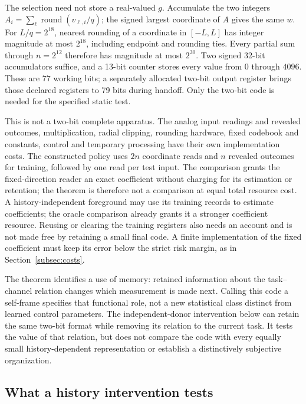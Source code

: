 \documentclass[12pt]{article}
\theoremstyle{definition}
\begin{document}
The selection need not store a real-valued $g$.
Accumulate the two integers
$A_i=\sum_\ell\operatorname{round}(v_{\ell,i}/q)$;
the signed largest coordinate of $A$ gives the same $w$.
For $L/q=2^{18}$, nearest rounding of a coordinate in $[-L,L]$
has integer magnitude at most $2^{18}$, including endpoint and
rounding ties. Every partial sum through $n=2^{12}$ therefore has
magnitude at most $2^{30}$. Two signed 32-bit accumulators suffice,
and a 13-bit counter stores every value from $0$ through $4096$.
These are 77 working bits; a separately allocated two-bit output
register brings those declared registers to 79 bits during handoff.
Only the two-bit code is needed for the specified static test.

This is not a two-bit complete apparatus.
The analog input readings and revealed outcomes, multiplication,
radial clipping, rounding hardware, fixed codebook and constants,
control and temporary processing have their own implementation costs.
The constructed policy uses $2n$ coordinate reads and $n$ revealed
outcomes for training, followed by one read per test input. The
comparison grants the fixed-direction reader an exact coefficient
without charging for its estimation or retention; the theorem is
therefore not a comparison at equal total resource cost.
A history-independent foreground may use its training records to
estimate coefficients; the oracle comparison already grants it a
stronger coefficient resource. Reusing or clearing the training
registers also needs an account and is not made free by retaining a
small final code. A finite implementation of the fixed coefficient
must keep its error below the strict risk margin, as in
Section~\ref{subsec:costs}.

The theorem identifies a use of memory: retained information about the
task--channel relation changes which measurement is made next.
Calling this code a self-frame specifies that functional role, not a
new statistical class distinct from learned control parameters. The
independent-donor intervention below can retain the same two-bit format
while removing its relation to the current task. It tests the value of
that relation, but does not compare the code with every equally small
history-dependent representation or establish a distinctively subjective
organization.

\subsection{What a history intervention tests}
\label{sec:formation-intervention}
\end{document}
